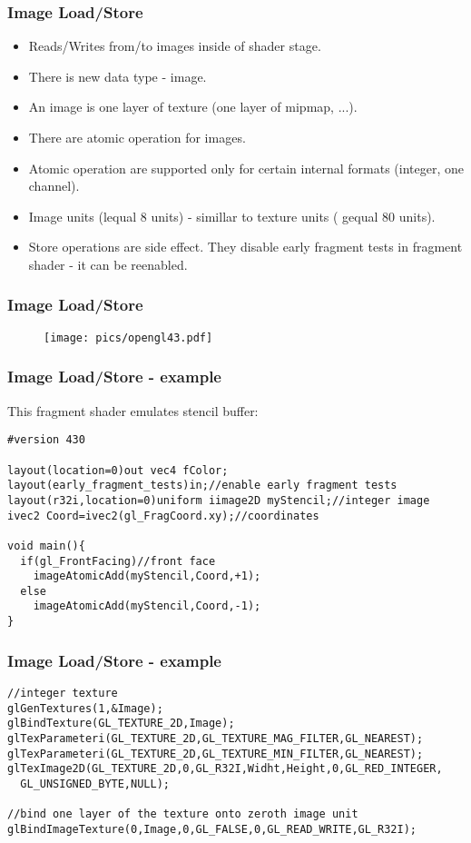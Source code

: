 
\begin{frame}
\frametitle{Image Load/Store}
	\begin{itemize}
	\item Reads/Writes from/to images inside of shader stage.
	\item There is new data type - image.
  \item An image is one layer of texture (one layer of mipmap, ...).
	\item There are atomic operation for images.
  \item Atomic operation are supported only for certain internal formats (integer, one channel).
  \item Image units (lequal 8 units) - simillar to texture units ( gequal 80 units).
	\item Store operations are side effect. They disable early fragment tests in fragment shader - it can be reenabled.
	\end{itemize}
\end{frame}

\begin{frame}
\frametitle{Image Load/Store}
	\begin{figure}[h]
	\texttt{[image: pics/opengl43.pdf]}
	\end{figure}
\end{frame}

\begin{frame}[fragile]
\frametitle{Image Load/Store - example}
  This fragment shader emulates stencil buffer:
{\scriptsize
\begin{verbatim}
#version 430

layout(location=0)out vec4 fColor;
layout(early_fragment_tests)in;//enable early fragment tests
layout(r32i,location=0)uniform iimage2D myStencil;//integer image
ivec2 Coord=ivec2(gl_FragCoord.xy);//coordinates

void main(){
  if(gl_FrontFacing)//front face
    imageAtomicAdd(myStencil,Coord,+1);
  else
    imageAtomicAdd(myStencil,Coord,-1);
}
\end{verbatim}
}
\end{frame}

\begin{frame}[fragile]
\frametitle{Image Load/Store - example}
{\scriptsize
\begin{verbatim}
//integer texture
glGenTextures(1,&Image);
glBindTexture(GL_TEXTURE_2D,Image);
glTexParameteri(GL_TEXTURE_2D,GL_TEXTURE_MAG_FILTER,GL_NEAREST);
glTexParameteri(GL_TEXTURE_2D,GL_TEXTURE_MIN_FILTER,GL_NEAREST);
glTexImage2D(GL_TEXTURE_2D,0,GL_R32I,Widht,Height,0,GL_RED_INTEGER,
  GL_UNSIGNED_BYTE,NULL);

//bind one layer of the texture onto zeroth image unit
glBindImageTexture(0,Image,0,GL_FALSE,0,GL_READ_WRITE,GL_R32I);

\end{verbatim}
}
\end{frame}

